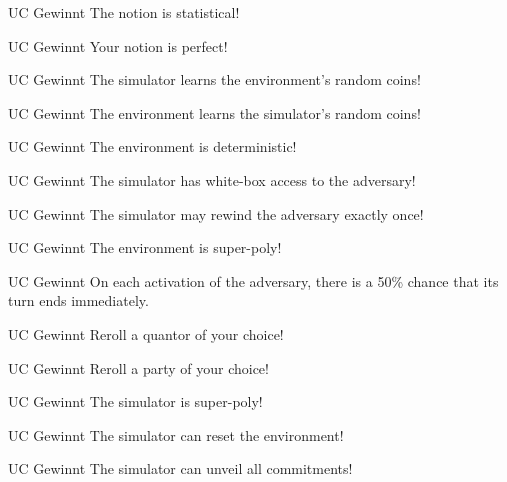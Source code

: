 \documentclass[avery5371,frame,grid]{flashcards}
\begin{document}
\begin{flashcard}{UC Gewinnt}
  The notion is statistical!
\end{flashcard}

\begin{flashcard}{UC Gewinnt}
  Your notion is perfect!
\end{flashcard}
\begin{flashcard}{UC Gewinnt}
  The simulator learns the environment's random coins!
\end{flashcard}
\begin{flashcard}{UC Gewinnt}
  The environment learns the simulator's random coins!
\end{flashcard}
\begin{flashcard}{UC Gewinnt}
  The environment is deterministic!
\end{flashcard}
\begin{flashcard}{UC Gewinnt}
  The simulator has white-box access to the adversary!
\end{flashcard}
\begin{flashcard}{UC Gewinnt}
  The simulator may rewind the adversary exactly once!
\end{flashcard}
\begin{flashcard}{UC Gewinnt}
  The environment is super-poly!
\end{flashcard}
\begin{flashcard}{UC Gewinnt}
  On each activation of the adversary, there is a 50\% chance that its turn ends immediately. 
\end{flashcard}
\begin{flashcard}{UC Gewinnt}
  Reroll a quantor of your choice!
\end{flashcard}
\begin{flashcard}{UC Gewinnt}
  Reroll a party of your choice!
\end{flashcard}
\begin{flashcard}{UC Gewinnt}
  The simulator is super-poly!
\end{flashcard}
\begin{flashcard}{UC Gewinnt}
  The simulator can reset the environment!
\end{flashcard}
\begin{flashcard}{UC Gewinnt}
  The simulator can unveil all commitments!
\end{flashcard}
\end{document}
